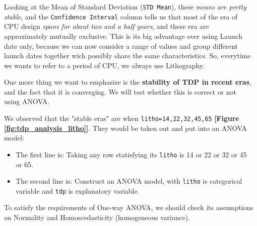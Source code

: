 Looking at the Mean of Standard Deviation (\verb|STD Mean|), these \textit{means are pretty stable}, and the \verb|Confidence Interval| column tells us that
most of the era of CPU design \textit{spans for about two and a half years}, and these era are approximately mutually exclusive. This is its big advantage over
using Launch date only, because we can now consider a range of values and group different launch dates together wich possibly share the same characteristics. So,
everytime we wants to refer to a period of CPU, we always use Lithography.

One more thing we want to emphasize is the \textbf{stability of TDP in recent eras}, and the fact that it is converging. We will test whether this is correct or not using
ANOVA.

We observed that the "stable eras" are when \verb|litho=14,22,32,45,65| \textbf{[Figure \ref{fig:tdp_analysis_litho}]}. They would be taken out and put into an ANOVA model:

\begin{itemize}
    \item The first line is: Taking any row statisfying its \verb|litho| is 14 or 22 or 32 or 45 or 65.
    \item The second line is: Construct an ANOVA model, with \verb|litho| is categorical variable and \verb|tdp| is explanatory variable.
\end{itemize}

To satisfy the requirements of One-way ANOVA, we should check its assumptions on Normality and Homoscedasticity (homogeneous variance).

